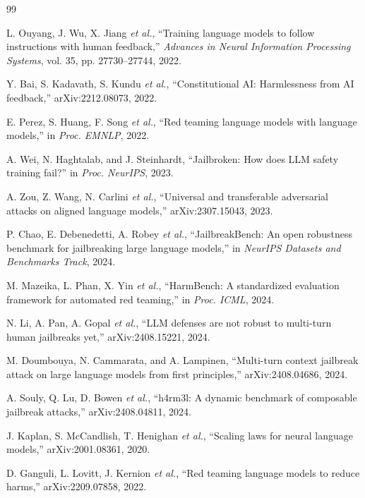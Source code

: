 \documentclass[11pt,a4paper]{article}
\begin{document}
\begin{thebibliography}{99}

L. Ouyang, J. Wu, X. Jiang \textit{et al.}, ``Training language models to follow instructions with human feedback,'' \textit{Advances in Neural Information Processing Systems}, vol. 35, pp. 27730--27744, 2022.

Y. Bai, S. Kadavath, S. Kundu \textit{et al.}, ``Constitutional AI: Harmlessness from AI feedback,'' arXiv:2212.08073, 2022.

E. Perez, S. Huang, F. Song \textit{et al.}, ``Red teaming language models with language models,'' in \textit{Proc. EMNLP}, 2022.

A. Wei, N. Haghtalab, and J. Steinhardt, ``Jailbroken: How does LLM safety training fail?'' in \textit{Proc. NeurIPS}, 2023.

A. Zou, Z. Wang, N. Carlini \textit{et al.}, ``Universal and transferable adversarial attacks on aligned language models,'' arXiv:2307.15043, 2023.

P. Chao, E. Debenedetti, A. Robey \textit{et al.}, ``JailbreakBench: An open robustness benchmark for jailbreaking large language models,'' in \textit{NeurIPS Datasets and Benchmarks Track}, 2024.

M. Mazeika, L. Phan, X. Yin \textit{et al.}, ``HarmBench: A standardized evaluation framework for automated red teaming,'' in \textit{Proc. ICML}, 2024.

N. Li, A. Pan, A. Gopal \textit{et al.}, ``LLM defenses are not robust to multi-turn human jailbreaks yet,'' arXiv:2408.15221, 2024.

M. Doumbouya, N. Cammarata, and A. Lampinen, ``Multi-turn context jailbreak attack on large language models from first principles,'' arXiv:2408.04686, 2024.

A. Souly, Q. Lu, D. Bowen \textit{et al.}, ``h4rm3l: A dynamic benchmark of composable jailbreak attacks,'' arXiv:2408.04811, 2024.

J. Kaplan, S. McCandlish, T. Henighan \textit{et al.}, ``Scaling laws for neural language models,'' arXiv:2001.08361, 2020.

D. Ganguli, L. Lovitt, J. Kernion \textit{et al.}, ``Red teaming language models to reduce harms,'' arXiv:2209.07858, 2022.


\end{thebibliography}
\end{document}

